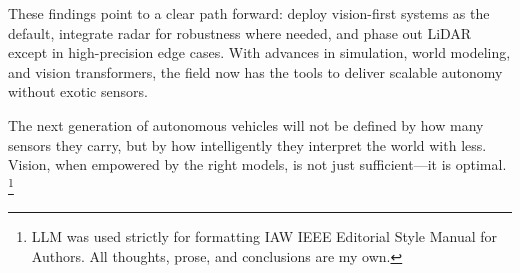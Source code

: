 \documentclass[12pt]{article}
\begin{document}
These findings point to a clear path forward: deploy vision-first systems as the default, integrate radar for robustness where needed, and phase out LiDAR except in high-precision edge cases. With advances in simulation, world modeling, and vision transformers, the field now has the tools to deliver scalable autonomy without exotic sensors.

The next generation of autonomous vehicles will not be defined by how many sensors they carry, but by how intelligently they interpret the world with less. Vision, when empowered by the right models, is not just sufficient—it is optimal.
\footnote{LLM was used strictly for formatting IAW IEEE Editorial Style Manual
	for Authors. All thoughts, prose, and conclusions are
my own.}
\newpage
{}
\printbibliography
\end{document}
